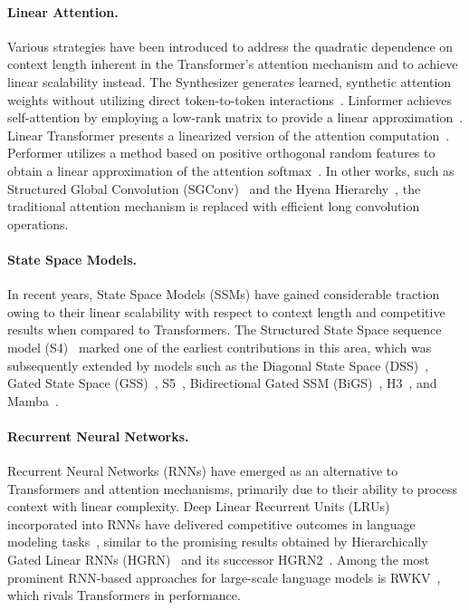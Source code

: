 \paragraph{Linear Attention.} Various strategies have been introduced to address the quadratic dependence on context length inherent in the Transformer’s attention mechanism and to achieve linear scalability instead. The Synthesizer generates learned, synthetic attention weights without utilizing direct token-to-token interactions~\citep{Tay:20arxiv}. Linformer achieves self-attention by employing a low-rank matrix to provide a linear approximation~\citep{Wang:20arxiv}. Linear Transformer presents a linearized version of the attention computation~\citep{Katharopoulos:20}. Performer utilizes a method based on positive orthogonal random features to obtain a linear approximation of the attention softmax~\citep{Choromanski:21}. In other works, such as Structured Global Convolution (SGConv)~\citep{Li:22} and the Hyena Hierarchy~\citep{Poli:23}, the traditional attention mechanism is replaced with efficient long convolution operations.

\paragraph{State Space Models.} In recent years, State Space Models (SSMs) have gained considerable traction owing to their linear scalability with respect to context length and competitive results when compared to Transformers. The Structured State Space sequence model (S4)~\citep{Gu:21} marked one of the earliest contributions in this area, which was subsequently extended by models such as the Diagonal State Space (DSS)~\citep{Gupta:22}, Gated State Space (GSS)~\citep{Mehta:22}, S5~\citep{Smith:22}, Bidirectional Gated SSM (BiGS)~\citep{Wang:22}, H3~\citep{Fu:23}, and Mamba~\citep{Gu:24arxiv}.

\paragraph{Recurrent Neural Networks.} Recurrent Neural Networks (RNNs) have emerged as an alternative to Transformers and attention mechanisms, primarily due to their ability to process context with linear complexity. Deep Linear Recurrent Units (LRUs) incorporated into RNNs have delivered competitive outcomes in language modeling tasks~\citep{Orvieto:23, De:24arxiv}, similar to the promising results obtained by Hierarchically Gated Linear RNNs (HGRN)~\citep{Qin:23} and its successor HGRN2~\citep{Qin:24arxiv}. Among the most prominent RNN-based approaches for large-scale language models is RWKV~\citep{Peng:23arxivshort,Peng:24arxivshort}, which rivals Transformers in performance.

